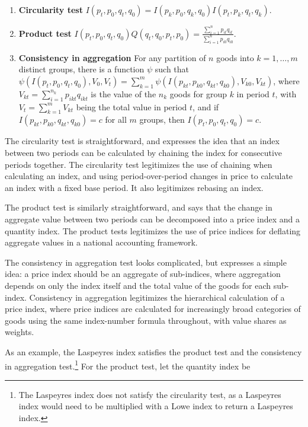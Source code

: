 \documentclass[]{article}
\begin{document}
\begin{enumerate}
\def\labelenumi{\arabic{enumi}.}
\item
  \textbf{Circularity test} \(I(p_{t}, p_{0}, q_{t}, q_{0}) = I(p_{k}, p_{0}, q_{k}, q_{0}) I(p_{t}, p_{k}, q_{t}, q_{k})\).
\item
  \textbf{Product test} \(I(p_{t}, p_{0}, q_{t}, q_{0}) Q(q_{t}, q_{0}, p_{t}, p_{0}) = \frac{\sum_{i = 1}^{n} p_{it}q_{it}}{\sum_{i = 1}^{n} p_{i0}q_{i0}}\).
\item
  \textbf{Consistency in aggregation} For any partition of \(n\) goods into \(k = 1, \ldots, m\) distinct groups, there is a function \(\psi\) such that \(\psi(I(p_{t}, p_{0}, q_{t}, q_{0}), V_{0}, V_{t}) = \sum_{k = 1}^{m} \psi(I(p_{kt}, p_{k0}, q_{kt}, q_{k0}), V_{k0}, V_{kt})\), where \(V_{kt} = \sum_{i = 1}^{n_{k}} p_{ikt}q_{ikt}\) is the value of the \(n_{k}\) goods for group \(k\) in period \(t\), with \(V_{t} = \sum_{k = 1}^{m} V_{kt}\) being the total value in period \(t\), and if \(I(p_{kt}, p_{k0}, q_{kt}, q_{k0}) = c\) for all \(m\) groups, then \(I(p_{t}, p_{0}, q_{t}, q_{0}) = c\).
\end{enumerate}

The circularity test is straightforward, and expresses the idea that an index between two periods can be calculated by chaining the index for consecutive periods together. The circularity test legitimizes the use of chaining when calculating an index, and using period-over-period changes in price to calculate an index with a fixed base period. It also legitimizes rebasing an index.

The product test is similarly straightforward, and says that the change in aggregate value between two periods can be decomposed into a price index and a quantity index. The product tests legitimizes the use of price indices for deflating aggregate values in a national accounting framework.

The consistency in aggregation test looks complicated, but expresses a simple idea: a price index should be an aggregate of sub-indices, where aggregation depends on only the index itself and the total value of the goods for each sub-index. Consistency in aggregation legitimizes the hierarchical calculation of a price index, where price indices are calculated for increasingly broad categories of goods using the same index-number formula throughout, with value shares as weights.

As an example, the Laspeyres index satisfies the product test and the consistency in aggregation test.\footnote{The Laspeyres index does not satisfy the circularity test, as a Laspeyres index would need to be multiplied with a Lowe index to return a Laspeyres index.} For the product test, let the quantity index be
\end{document}
